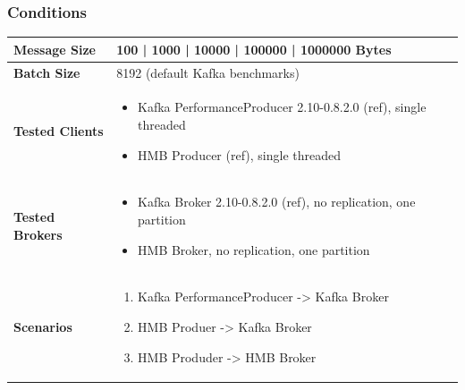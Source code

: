 \subsubsection{Conditions}
\begin{table}[H]
\begin{tabular}{|l| p{12cm}|} \hline
{\bf Message Size}   & 100 | 1000 | 10000 | 100000 | 1000000 Bytes \\ \hline
{\bf Batch Size}     & 8192 (default Kafka benchmarks)\\ \hline
{\bf Tested Clients} &
    \begin{itemize}
        \item Kafka PerformanceProducer 2.10-0.8.2.0 (ref), single threaded
        \item HMB Producer (ref), single threaded
    \end{itemize}\\ \hline
{\bf Tested Brokers} &
    \begin{itemize}
        \item Kafka Broker 2.10-0.8.2.0 (ref), no replication, one partition
        \item HMB Broker, no replication, one partition
    \end{itemize}\\ \hline
{\bf Scenarios} &
    \begin{enumerate}
        \item Kafka PerformanceProducer -> Kafka Broker
        \item HMB Produer -> Kafka Broker
        \item HMB Produder -> HMB Broker
    \end{enumerate} \\ \hline
\end{tabular}
\end{table}

